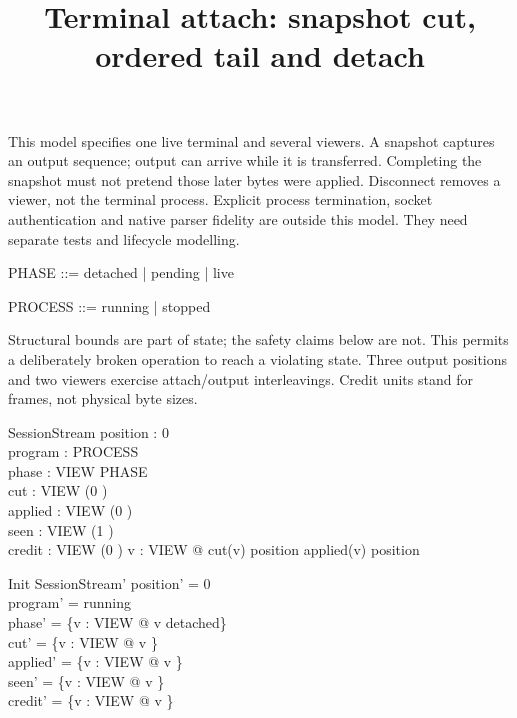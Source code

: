\documentclass[a4paper,10pt]{article}
\begin{document}
\title{Terminal attach: snapshot cut, ordered tail and detach}
\maketitle

This model specifies one live terminal and several viewers. A snapshot
captures an output sequence; output can arrive while it is transferred.
Completing the snapshot must not pretend those later bytes were applied.
Disconnect removes a viewer, not the terminal process. Explicit process
termination, socket authentication and native parser fidelity are outside
this model. They need separate tests and lifecycle modelling.

\begin{zed}
[VIEW]
\end{zed}
\begin{zed}
PHASE ::= detached | pending | live
\end{zed}
\begin{zed}
PROCESS ::= running | stopped
\end{zed}

Structural bounds are part of state; the safety claims below are not.
This permits a deliberately broken operation to reach a violating state.
Three output positions and two viewers exercise attach/output interleavings.
Credit units stand for frames, not physical byte sizes.

\begin{schema}{SessionStream}
position : 0  \\
program : PROCESS \\
phase : VIEW \fun PHASE \\
cut : VIEW \fun (0 ) \\
applied : VIEW \fun (0 ) \\
seen : VIEW \fun \power (1 ) \\
credit : VIEW \fun (0 )
\where
\forall v : VIEW @ cut(v) \leq position \land applied(v) \leq position
\end{schema}

\begin{schema}{Init}
SessionStream'
\where
position' = 0 \\
program' = running \\
phase' = \{v : VIEW @ v \mapsto detached\} \\
cut' = \{v : VIEW @ v \} \\
applied' = \{v : VIEW @ v \} \\
seen' = \{v : VIEW @ v \mapsto \emptyset\} \\
credit' = \{v : VIEW @ v \}
\end{schema}
\end{document}

